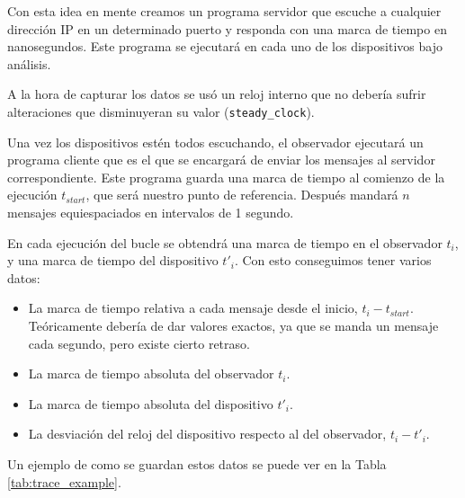 Con esta idea en mente creamos un programa servidor que escuche a cualquier dirección IP en un determinado puerto y responda con una marca de tiempo en nanosegundos. Este programa se ejecutará en cada uno de los dispositivos bajo análisis.

A la hora de capturar los datos se usó un reloj interno que no debería sufrir alteraciones que disminuyeran su valor (\texttt{steady\_clock}\cite{steadyclockcpp}).

Una vez los dispositivos estén todos escuchando, el observador ejecutará un programa cliente que es el que se encargará de enviar los mensajes al servidor correspondiente. Este programa guarda una marca de tiempo al comienzo de la ejecución $t_{start}$, que será nuestro punto de referencia. Después mandará $n$ mensajes equiespaciados en intervalos de 1 segundo.

En cada ejecución del bucle se obtendrá una marca de tiempo en el observador $t_i$, y una marca de tiempo del dispositivo $t'_i$. Con esto conseguimos tener varios datos:
\begin{itemize}
    \item La marca de tiempo relativa a cada mensaje desde el inicio, $t_i - t_{start}$. Teóricamente debería de dar valores exactos, ya que se manda un mensaje cada segundo, pero existe cierto retraso.
    \item La marca de tiempo absoluta del observador $t_i$.
    \item La marca de tiempo absoluta del dispositivo $t'_i$.
    \item La desviación del reloj del dispositivo respecto al del observador, $t_i - t'_i$.
\end{itemize}

Un ejemplo de como se guardan estos datos se puede ver en la Tabla \ref{tab:trace_example}.
\begin{table}
    \centering
    \caption{Ejemplo de los datos obtenidos de cada dispositivo}
    \label{tab:trace_example}
\end{table}


